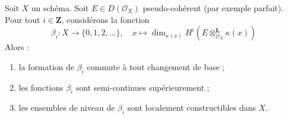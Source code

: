 \begin{lemma}
\label{lemma-jump-loci}
Soit $X$ un schéma. Soit $E \in D(\mathcal{O}_X)$ pseudo-cohérent
(par exemple parfait). Pour tout $i \in \mathbf{Z}$, considérons la fonction
$$
\beta_i : X \longrightarrow \{0, 1, 2, \ldots\},\quad
x \longmapsto
\dim_{\kappa(x)}
H^i(E \otimes_{\mathcal{O}_X}^\mathbf{L} \kappa(x))
$$
Alors :
\begin{enumerate}
\item la formation de $\beta_i$ commute à tout changement de base ;
\item les fonctions $\beta_i$ sont semi-continues supérieurement ;
\item les ensembles de niveau de $\beta_i$ sont localement constructibles dans $X$.
\end{enumerate}
\end{lemma}


